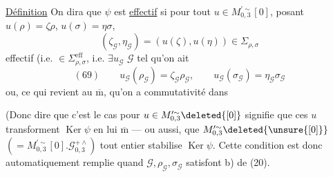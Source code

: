
\uline{Définition} On dira que $\psi$ est \uline{effectif} si pour tout
$u\in M_{0,3}^{\prime\sim}[0]$, posant $u(\rho)=\zeta\rho$, $u(\sigma)=\eta\sigma$,
\[
 (\zeta_{\mathcal{G}},\eta_{\mathcal{G}})
 =(u(\zeta),u(\eta))\in\Sigma_{\rho,\sigma}
\]
effectif (i.e. $\in\Sigma_{\rho,\sigma}^{\mathrm{eff}}$, i.e. $\exists u_{\mathcal{G}}$  $\mathcal{G}$ tel qu'on ait 
\[
 (69)\qquad
 u_{\mathcal{G}}(\rho_{\mathcal{G}})=\zeta_{\mathcal{G}}\rho_{\mathcal{G}},
 \qquad
 u_{\mathcal{G}}(\sigma_{\mathcal{G}})=\eta_{\mathcal{G}}\sigma_{\mathcal{G}}
\]
ou, ce qui revient au $\overline{\mathrm m}$, qu'on a commutativité dans

(Donc dire que c'est le cas pour  $u\in M_{0,3}^{\prime\sim}\deleted{[0]}$ signifie que ces $u$ transforment $\operatorname{Ker}\psi$ en lui $\overline{\mathrm m}$ --- ou aussi, que
$M_{0,3}^{\prime\sim}\deleted{\unsure{[0]}}$
$(=M_{0,3}^{\prime\sim}[0].\mathcal{G}_{0,3}^{+\wedge})$ tout entier stabilise $\operatorname{Ker}\psi$.
 Cette condition est donc automatiquement remplie quand $\mathcal{G},\rho_{\mathcal{G}},\sigma_{\mathcal{G}}$ satisfont  b) de (20).


